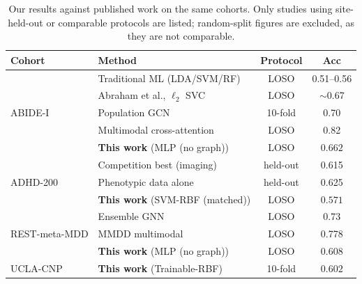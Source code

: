 \begin{table}[t]
\caption{Our results against published work on the same cohorts. Only studies using site-held-out or comparable protocols are listed; random-split figures are excluded, as they are not comparable.}
\label{tab:published-comparison}
\centering
\small
\renewcommand{\arraystretch}{1.15}
\begin{tabular}{|l|l|c|c|}
\hline
\textbf{Cohort} & \textbf{Method} & \textbf{Protocol} & \textbf{Acc} \\
\hline
 \multirow{5}{*}{ABIDE-I} & Traditional ML (LDA/SVM/RF)~\cite{eslami2019} & LOSO & 0.51--0.56 \\
  & Abraham et al., $\ell_2$ SVC~\cite{abraham2017} & LOSO & $\sim$0.67 \\
  & Population GCN~\cite{parisot2018} & 10-fold & 0.70 \\
  & Multimodal cross-attention~\cite{fusion2026} & LOSO & 0.82 \\
  & \textbf{This work} (MLP (no graph)) & LOSO & $\mathbf{0.662}$ \\
\hline
 \multirow{3}{*}{ADHD-200} & Competition best (imaging)~\cite{adhd200comp} & held-out & 0.615 \\
  & Phenotypic data alone~\cite{brown2012} & held-out & 0.625 \\
  & \textbf{This work} (SVM-RBF (matched)) & LOSO & $\mathbf{0.571}$ \\
\hline
 \multirow{3}{*}{REST-meta-MDD} & Ensemble GNN~\cite{mddgnn} & LOSO & 0.73 \\
  & MMDD multimodal~\cite{mmdd} & LOSO & 0.778 \\
  & \textbf{This work} (MLP (no graph)) & LOSO & $\mathbf{0.608}$ \\
\hline
 \multirow{1}{*}{UCLA-CNP} & \textbf{This work} (Trainable-RBF) & 10-fold & $\mathbf{0.602}$ \\
\hline
\end{tabular}
\end{table}
